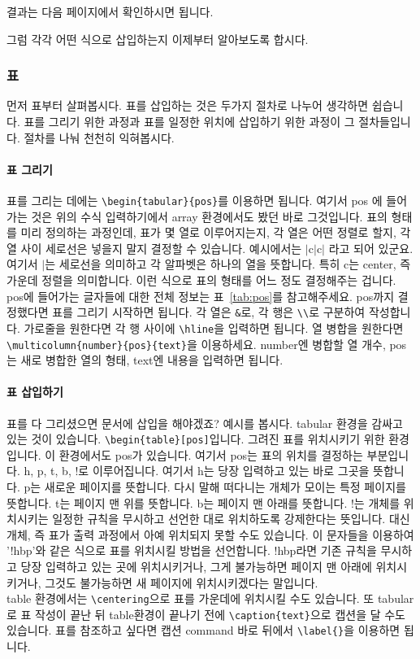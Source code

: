 결과는 다음 페이지에서 확인하시면 됩니다.



그럼 각각 어떤 식으로 삽입하는지 이제부터 알아보도록 합시다.

\subsubsection{표}
\label{subsec:mktab}
먼저 표부터 살펴봅시다.
표를 삽입하는 것은 두가지 절차로 나누어 생각하면 쉽습니다.
표를 그리기 위한 과정과 표를 일정한 위치에 삽입하기 위한 과정이 그 절차들입니다.
절차를 나눠 천천히 익혀봅시다.

\paragraph{표 그리기}
표를 그리는 데에는 \verb|\begin{tabular}{pos}|를 이용하면 됩니다.
여기서 pos 에 들어가는 것은 위의 수식 입력하기에서 array 환경에서도 봤던 바로 그것입니다.
표의 형태를 미리 정의하는 과정인데, 표가 몇 열로 이루어지는지, 각 열은 어떤 정렬로 할지, 각 열 사이 세로선은 넣을지 말지 결정할 수 있습니다. 예시에서는 $\mid$c$\mid$c$\mid$ 라고 되어 있군요.
여기서 $\mid$는 세로선을 의미하고 각 알파벳은 하나의 열을 뜻합니다.
특히 c는 center, 즉 가운데 정렬을 의미합니다.
이런 식으로 표의 형태를 어느 정도 결정해주는 겁니다.
pos에 들어가는 글자들에 대한 전체 정보는 표~\ref{tab:pos}를 참고해주세요.
pos까지 결정했다면 표를 그리기 시작하면 됩니다.
각 열은 \verb|&|로, 각 행은 \verb|\\|로 구분하여 작성합니다.
가로줄을 원한다면 각 행 사이에 \verb|\hline|을 입력하면 됩니다.
열 병합을 원한다면 \verb|\multicolumn{number}{pos}{text}|을 이용하세요.
number엔 병합할 열 개수, pos는 새로 병합한 열의 형태, text엔 내용을 입력하면 됩니다.

\paragraph{표 삽입하기}
표를 다 그리셨으면 문서에 삽입을 해야겠죠?
예시를 봅시다. tabular 환경을 감싸고 있는 것이 있습니다.
\verb|\begin{table}[pos]|입니다.
그려진 표를 위치시키기 위한 환경입니다.
이 환경에서도 pos가 있습니다.
여기서 pos는 표의 위치를 결정하는 부분입니다.
h, p, t, b, !로 이루어집니다.
여기서 h는 당장 입력하고 있는 바로 그곳을 뜻합니다.
p는 새로운 페이지를 뜻합니다. 다시 말해 떠다니는 개체가 모이는 특정 페이지를 뜻합니다.
t는 페이지 맨 위를 뜻합니다.
b는 페이지 맨 아래를 뜻합니다.
!는 개체를 위치시키는 일정한 규칙을 무시하고 선언한 대로 위치하도록 강제한다는 뜻입니다.
대신 개체, 즉 표가 출력 과정에서 아예 위치되지 못할 수도 있습니다.
이 문자들을 이용하여 '!hbp'와 같은 식으로 표를 위치시킬 방법을 선언합니다.
!hbp라면 기존 규칙을 무시하고 당장 입력하고 있는 곳에 위치시키거나, 그게 불가능하면 페이지 맨 아래에 위치시키거나, 그것도 불가능하면 새 페이지에 위치시키겠다는 말입니다.\\
table 환경에서는 \verb|\centering|으로 표를 가운데에 위치시킬 수도 있습니다.
또 tabular로 표 작성이 끝난 뒤 table환경이 끝나기 전에 \verb|\caption{text}|으로 캡션을 달 수도 있습니다.
표를 참조하고 싶다면 캡션 command 바로 뒤에서 \verb|\label{}|을 이용하면 됩니다.


